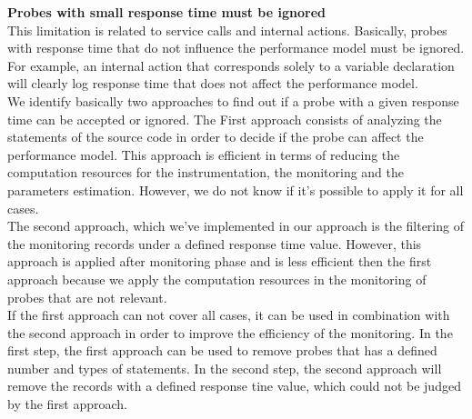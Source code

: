 \textbf{Probes with small response time must be ignored}\\
This limitation is related to service calls and internal actions. Basically, probes with response time that do not influence the performance model must be ignored. For example, an internal action that corresponds solely to a variable declaration will clearly log response time that does not affect the performance model.\\
 
We identify basically two approaches to find out if a probe with a given response time can be accepted or ignored. The First approach consists of analyzing the statements of the source code in order to decide if the probe can affect the performance model. This approach is efficient in terms of reducing the computation resources for the instrumentation, the monitoring and the parameters estimation.  However, we do not know if it's possible to apply it for all cases.\\

The second approach, which we've implemented in our approach is the filtering of the monitoring records under a defined response time value. However, this approach is applied after monitoring phase and is less efficient then the first approach because we apply the computation resources in the monitoring of probes that are not relevant. \\

If the first approach can not cover all cases, it can be used in combination with the second approach in order to improve the efficiency of the monitoring. In the first step, the first approach can be used to remove probes that has a defined number and types of statements. In the second step, the second approach will remove the records with a defined response tine value, which could not be judged by the first approach.\\


 
